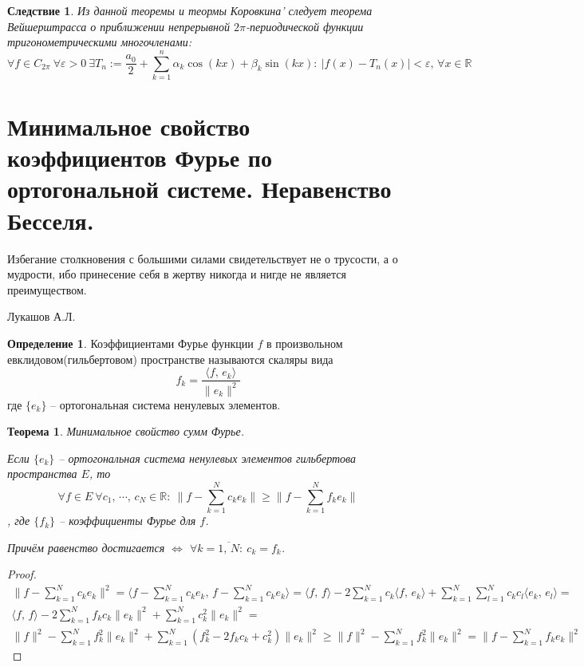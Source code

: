 \documentclass[a4paper,12pt]{article}
\renewcommand{\geq}{\ensuremath{\geqslant}}
\theoremstyle{plain}
\newtheorem{theorem}{Теорема}[section]
\newtheorem*{corollary}{Следствие}
\theoremstyle{definition}
\newtheorem{definition}{Определение}[section]
\theoremstyle{remark}
\begin{document}
\begin{corollary}
	Из данной теоремы и теормы Коровкина' следует теорема Вейшерштрасса о приближении непрерывной $2\pi$-периодической функции тригонометрическими многочленами:
	\[\forall f \in C_{2\pi} \: \forall \varepsilon > 0 \: \exists T_n := \frac{a_0}{2} + \sum_{k = 1}^n \alpha_k\cos(kx) + \beta_k\sin(kx) :\: |f(x) - T_n(x)| < \varepsilon,\, \forall x \in \mathbb{R}\]
\end{corollary}

\section{Минимальное свойство коэффициентов Фурье по ортогональной системе. Неравенство Бесселя.}

\epigraph{Избегание столкновения с большими силами свидетельствует не о трусости, а о мудрости, ибо принесение себя в жертву никогда и нигде не является преимуществом.}{Лукашов А.Л.}

\begin{definition}
	Коэффициентами Фурье функции $f$ в произвольном\newline
	евклидовом(гильбертовом) пространстве называются скаляры вида
	\[f_k = \frac{\langle f,\,e_k\rangle}{\|e_k\|^2}\]
	где $\{e_k\}$ -- ортогональная система ненулевых элементов.
\end{definition}

\begin{theorem}
	Минимальное свойство сумм Фурье.

	Если $\{e_k\}$ -- ортогональная система ненулевых элементов гильбертова пространства $E$, то
	\[\forall f \in E \: \forall c_1,\,\cdots,\,c_N \in \mathbb{R}:\: \|f - \sum_{k = 1}^N c_ke_k\| \geq \|f - \sum_{k = 1}^N f_ke_k\|\], где $\{f_k\}$ -- коэффициенты Фурье для $f$.

	Причём равенство достигается $\Leftrightarrow$ $\forall k = \overline{1,\,N}:\: c_k = f_k$.
\end{theorem}
\begin{proof}
	\begin{align*}
		\|f - \sum_{k=1}^N c_ke_k\|^2 = \langle f - \sum_{k = 1}^N c_ke_k,\, f - \sum_{k = 1}^N c_ke_k\rangle = \langle f,\,f\rangle - 2\sum_{k = 1}^Nc_k \langle f,\, e_k\rangle + \sum_{k = 1}^N\sum_{l = 1}^N c_kc_l \langle e_k,\, e_l \rangle = \\
		\langle f,\, f\rangle - 2\sum_{k = 1}^N f_kc_k \|e_k\|^2 + \sum_{k = 1}^Nc_k^2\|e_k\|^2 =                                                                                                                                                    \\
		\|f\|^2 - \sum_{k = 1}^N f_k^2\|e_k\|^2 + \sum_{k = 1}^N (f_k^2 - 2f_kc_k + c_k^2)\|e_k\|^2 \geq \|f\|^2 - \sum_{k = 1}^Nf_k^2\|e_k\|^2 = \|f - \sum_{k = 1}^N f_ke_k\|^2
	\end{align*}
\end{proof}
\end{document}
